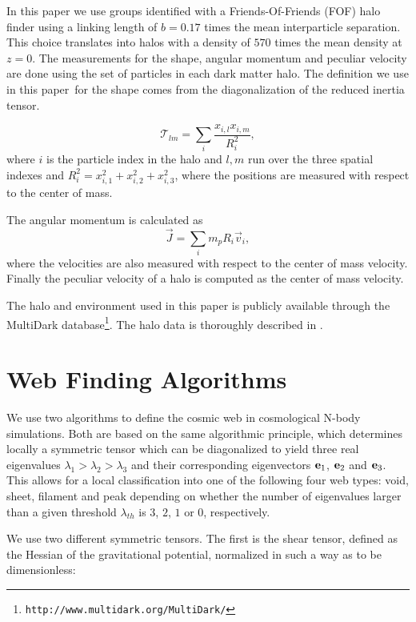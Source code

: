 \documentclass[useAMS,usenatbib]{mn2e}
\newcommand{\documentname}{paper~}
\begin{document}
In this paper we use groups identified with a Friends-Of-Friends (FOF) halo
finder using a linking length of $b=0.17$ times the mean interparticle
separation. This choice translates into halos with a density of $570$
times the mean density at $z=0$. The measurements for the shape,
angular momentum and peculiar velocity are done using the set of
particles in each dark matter halo. The definition we use in this
\documentname for the shape comes from the diagonalization of the
reduced inertia tensor.

\begin{equation}
{\mathcal T}_{lm} = \sum_{i}\frac{x_{i,l}x_{i,m}}{R_i^2},
\end{equation}
where $i$ is the particle index in the halo and $l,m$ run over the
three spatial indexes  and $R_i^2 = x_{i,1}^2 + x_{i,2}^2 +
x_{i,3}^2$, where the positions are measured with respect to the
center of mass.

The angular momentum is calculated as
\begin{equation}
\vec{J} = \sum_{i}m_p{R_i}\vec{v}_i,
\end{equation}
where the velocities are also measured with respect to the center of
mass velocity. Finally the peculiar velocity of a halo is computed as
the center of mass velocity.

The halo and environment used in this paper is publicly available through the
MultiDark database\footnote{\texttt{http://www.multidark.org/MultiDark/}}. The
halo data is thoroughly described in \cite{2013AN....334..691R}.



\section{Web Finding Algorithms}
\label{sec:algorithms}

We use two algorithms to define the cosmic web in cosmological N-body
simulations. Both are based on the same algorithmic principle, which
determines locally a symmetric tensor which can be diagonalized to yield
three real eigenvalues $\lambda_1>\lambda_2>\lambda_3$ and their
corresponding eigenvectors ${\bf e}_{1}$, ${\bf e}_2$ and ${\bf
 e}_3$. This allows for a local classification into one of the
following four web types: void, sheet, filament and peak depending
on whether the number of eigenvalues larger than a given threshold
$\lambda_{th}$ is $3$, $2$, $1$ or $0$, respectively.

We use two different symmetric tensors. The first is the shear tensor,
defined as the Hessian of the gravitational potential, normalized in
such a way as to be dimensionless:
\end{document}
